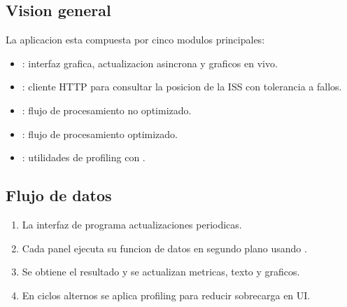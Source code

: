 \documentclass[letterpaper,10pt,spanish]{sphinxmanual}
\begin{document}
\subsection{Vision general}
\label{\detokenize{arquitectura:vision-general}}
\sphinxAtStartPar
La aplicacion esta compuesta por cinco modulos principales:
\begin{itemize}
\item {} 
\sphinxAtStartPar
{}: interfaz grafica, actualizacion asincrona y graficos en vivo.

\item {} 
\sphinxAtStartPar
{}: cliente HTTP para consultar la posicion de la ISS con tolerancia a fallos.

\item {} 
\sphinxAtStartPar
{}: flujo de procesamiento no optimizado.

\item {} 
\sphinxAtStartPar
{}: flujo de procesamiento optimizado.

\item {} 
\sphinxAtStartPar
{}: utilidades de profiling con .

\end{itemize}


\subsection{Flujo de datos}
\label{\detokenize{arquitectura:flujo-de-datos}}\begin{enumerate}
%
\item {} 
\sphinxAtStartPar
La interfaz de  programa actualizaciones periodicas.

\item {} 
\sphinxAtStartPar
Cada panel ejecuta su funcion de datos en segundo plano usando .

\item {} 
\sphinxAtStartPar
Se obtiene el resultado y se actualizan metricas, texto y graficos.

\item {} 
\sphinxAtStartPar
En ciclos alternos se aplica profiling para reducir sobrecarga en UI.

\end{enumerate}
\end{document}
